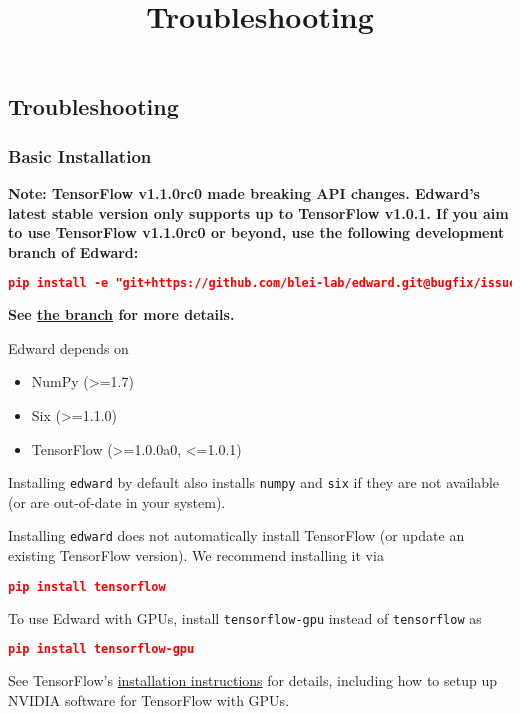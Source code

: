 \title{Troubleshooting}

\subsection{Troubleshooting}

\subsubsection{Basic Installation}

\textbf{Note:
TensorFlow v1.1.0rc0 made breaking API changes.
Edward's latest stable version only supports up to TensorFlow v1.0.1.
If you aim to use TensorFlow v1.1.0rc0 or beyond, use the
following development branch of Edward:
}

\begin{lstlisting}[language=JSON]
pip install -e "git+https://github.com/blei-lab/edward.git@bugfix/issue-451#egg=edward"
\end{lstlisting}

\textbf{See \href{https://github.com/blei-lab/edward/pull/452}
{the branch} for more details.}

Edward depends on

\begin{itemize}
  \item NumPy (>=1.7)
  \item Six (>=1.1.0)
  \item TensorFlow (>=1.0.0a0, <=1.0.1)
\end{itemize}

Installing \texttt{edward} by default also installs \texttt{numpy} and
\texttt{six} if they are not available (or are out-of-date in your
system).

Installing \texttt{edward} does not automatically install TensorFlow
(or update an existing TensorFlow version). We recommend installing
it via

\begin{lstlisting}[language=JSON]
pip install tensorflow
\end{lstlisting}

To use Edward with GPUs, install \texttt{tensorflow-gpu} instead of
\texttt{tensorflow} as

\begin{lstlisting}[language=JSON]
pip install tensorflow-gpu
\end{lstlisting}

See TensorFlow's
\href{https://www.tensorflow.org/install/}{installation instructions}
for details, including how to setup up NVIDIA software for TensorFlow with GPUs.

